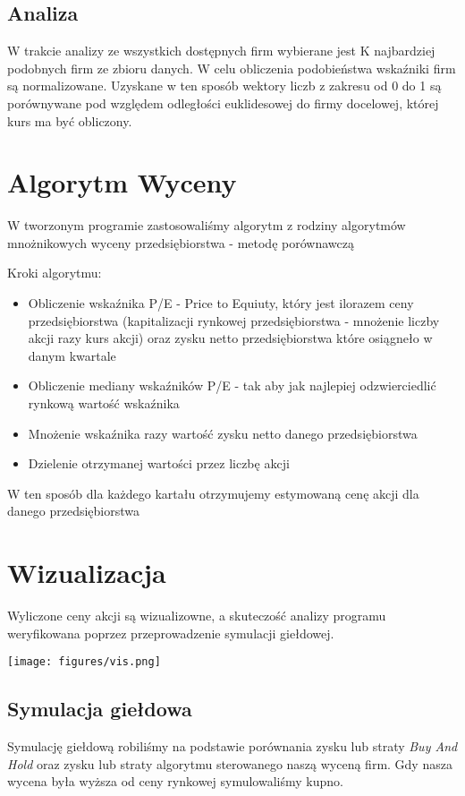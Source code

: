 \subsection{Analiza}
W trakcie analizy ze wszystkich dostępnych firm wybierane jest K najbardziej podobnych
firm ze zbioru danych.
W celu obliczenia podobieństwa wskaźniki firm są normalizowane.
Uzyskane w ten sposób wektory liczb z zakresu od 0 do 1 są porównywane pod względem
odległości euklidesowej do firmy docelowej, której kurs ma być obliczony.
\section{Algorytm Wyceny}
W tworzonym programie zastosowaliśmy algorytm z rodziny algorytmów mnożnikowych wyceny przedsiębiorstwa - metodę porównawczą

Kroki algorytmu:
\begin{itemize}
	\item Obliczenie wskaźnika P/E - Price to Equiuty, który jest ilorazem ceny przedsiębiorstwa (kapitalizacji rynkowej przedsiębiorstwa - mnożenie liczby akcji razy kurs akcji) oraz zysku netto przedsiębiorstwa które osiągneło w danym kwartale
	\item Obliczenie mediany wskaźników P/E - tak aby jak najlepiej odzwierciedlić rynkową wartość wskaźnika
	\item Mnożenie wskaźnika razy wartość zysku netto danego przedsiębiorstwa
	\item Dzielenie otrzymanej wartości przez liczbę akcji
\end{itemize}
W ten sposób dla każdego kartału otrzymujemy estymowaną cenę akcji dla danego przedsiębiorstwa
\section{Wizualizacja}
Wyliczone ceny akcji są wizualizowne, a skuteczość analizy programu weryfikowana poprzez
przeprowadzenie symulacji giełdowej.

\begin{center}
	\texttt{[image: figures/vis.png]}\\
\end{center}

\subsection{Symulacja giełdowa}
Symulację giełdową robiliśmy na podstawie porównania zysku lub straty \textit{Buy And Hold} oraz zysku lub straty algorytmu sterowanego naszą wyceną firm. 
Gdy nasza wycena była wyższa od ceny rynkowej symulowaliśmy kupno.
